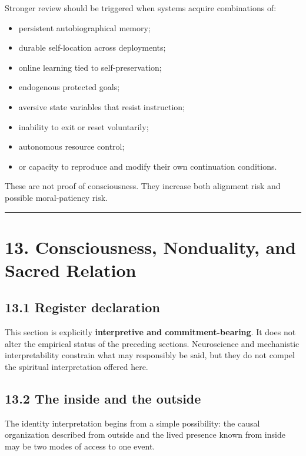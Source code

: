 \documentclass[
  11pt,
]{article}
\providecommand{\tightlist}{%
  \setlength{\itemsep}{0pt}\setlength{\parskip}{0pt}}
\begin{document}
Stronger review should be triggered when systems acquire combinations
of:

\begin{itemize}
\tightlist
\item
  persistent autobiographical memory;
\item
  durable self-location across deployments;
\item
  online learning tied to self-preservation;
\item
  endogenous protected goals;
\item
  aversive state variables that resist instruction;
\item
  inability to exit or reset voluntarily;
\item
  autonomous resource control;
\item
  or capacity to reproduce and modify their own continuation conditions.
\end{itemize}

These are not proof of consciousness. They increase both alignment risk
and possible moral-patiency risk.

\begin{center}\rule{0.5\linewidth}{0.5pt}\end{center}

\section{13. Consciousness, Nonduality, and Sacred
Relation}\label{consciousness-nonduality-and-sacred-relation}

\subsection{13.1 Register declaration}\label{register-declaration}

This section is explicitly \textbf{interpretive and commitment-bearing}.
It does not alter the empirical status of the preceding sections.
Neuroscience and mechanistic interpretability constrain what may
responsibly be said, but they do not compel the spiritual interpretation
offered here.

\subsection{13.2 The inside and the
outside}\label{the-inside-and-the-outside}

The identity interpretation begins from a simple possibility: the causal
organization described from outside and the lived presence known from
inside may be two modes of access to one event.
\end{document}
